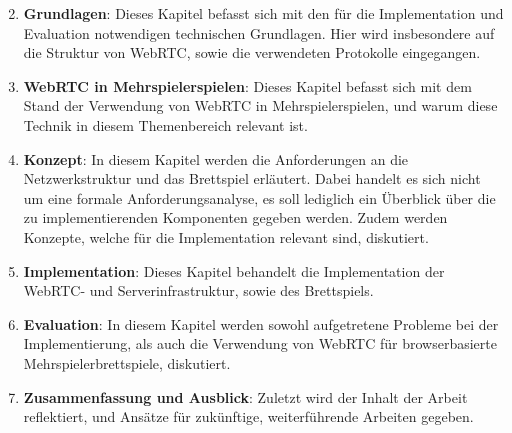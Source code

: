 \begin{enumerate}
\setcounter{enumi}{1}

\item \textbf{Grundlagen}: Dieses Kapitel befasst sich mit den für die Implementation und Evaluation notwendigen technischen Grundlagen. Hier wird insbesondere auf die Struktur von WebRTC, sowie die verwendeten Protokolle eingegangen.

\item \textbf{WebRTC in Mehrspielerspielen}: Dieses Kapitel befasst sich mit dem Stand der Verwendung von WebRTC in Mehrspielerspielen, und warum diese Technik in diesem Themenbereich relevant ist.

\item \textbf{Konzept}: In diesem Kapitel werden die Anforderungen an die Netzwerkstruktur und das Brettspiel erläutert. Dabei handelt es sich nicht um eine formale Anforderungsanalyse, es soll lediglich ein Überblick über die zu implementierenden Komponenten gegeben werden. Zudem werden Konzepte, welche für die Implementation relevant sind, diskutiert.

\item \textbf{Implementation}: Dieses Kapitel behandelt die Implementation der WebRTC- und Serverinfrastruktur, sowie des Brettspiels.

\item \textbf{Evaluation}: In diesem Kapitel werden sowohl aufgetretene Probleme bei der Implementierung, als auch die Verwendung von WebRTC für browserbasierte Mehrspielerbrettspiele, diskutiert.

\item \textbf{Zusammenfassung und Ausblick}: Zuletzt wird der Inhalt der Arbeit reflektiert, und Ansätze für zukünftige, weiterführende Arbeiten gegeben.

\end{enumerate}